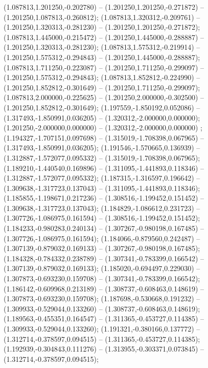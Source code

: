  (1.087813,1.201250,-0.202780) -- (1.201250,1.201250,-0.271872) -- (1.201250,1.087813,-0.260812);
 (1.087813,1.320312,-0.209761) -- (1.201250,1.320313,-0.281230) -- (1.201250,1.201250,-0.271872);
 (1.087813,1.445000,-0.215472) -- (1.201250,1.445000,-0.288887) -- (1.201250,1.320313,-0.281230);
 (1.087813,1.575312,-0.219914) -- (1.201250,1.575312,-0.294843) -- (1.201250,1.445000,-0.288887);
 (1.087813,1.711250,-0.223087) -- (1.201250,1.711250,-0.299097) -- (1.201250,1.575312,-0.294843);
 (1.087813,1.852812,-0.224990) -- (1.201250,1.852812,-0.301649) -- (1.201250,1.711250,-0.299097);
 (1.087813,2.000000,-0.225625) -- (1.201250,2.000000,-0.302500) -- (1.201250,1.852812,-0.301649);
 (1.197559,-1.850192,0.052086) -- (1.317493,-1.850991,0.036205) -- (1.320312,-2.000000,0.000000);
 (1.201250,-2.000000,0.000000) -- (1.320312,-2.000000,0.000000) ;
 (1.194327,-1.707151,0.097698) -- (1.315019,-1.708398,0.067965) -- (1.317493,-1.850991,0.036205);
 (1.191546,-1.570665,0.136939) -- (1.312887,-1.572077,0.095332) -- (1.315019,-1.708398,0.067965);
 (1.189210,-1.440540,0.169896) -- (1.311095,-1.441893,0.118346) -- (1.312887,-1.572077,0.095332);
 (1.187315,-1.316597,0.196642) -- (1.309638,-1.317723,0.137043) -- (1.311095,-1.441893,0.118346);
 (1.185855,-1.198671,0.217236) -- (1.308516,-1.199452,0.151452) -- (1.309638,-1.317723,0.137043);
 (1.184829,-1.086612,0.231723) -- (1.307726,-1.086975,0.161594) -- (1.308516,-1.199452,0.151452);
 (1.184233,-0.980283,0.240134) -- (1.307267,-0.980198,0.167485) -- (1.307726,-1.086975,0.161594);
 (1.184066,-0.879560,0.242487) -- (1.307139,-0.879032,0.169133) -- (1.307267,-0.980198,0.167485);
 (1.184328,-0.784332,0.238789) -- (1.307341,-0.783399,0.166542) -- (1.307139,-0.879032,0.169133);
 (1.185020,-0.694497,0.229030) -- (1.307873,-0.693230,0.159708) -- (1.307341,-0.783399,0.166542);
 (1.186142,-0.609968,0.213189) -- (1.308737,-0.608463,0.148619) -- (1.307873,-0.693230,0.159708);
 (1.187698,-0.530668,0.191232) -- (1.309933,-0.529044,0.133260) -- (1.308737,-0.608463,0.148619);
 (1.189563,-0.455351,0.164547) -- (1.311365,-0.453727,0.114385) -- (1.309933,-0.529044,0.133260);
 (1.191321,-0.380166,0.137772) -- (1.312714,-0.378597,0.094515) -- (1.311365,-0.453727,0.114385);
 (1.192939,-0.304843,0.111276) -- (1.313955,-0.303371,0.073845) -- (1.312714,-0.378597,0.094515);
